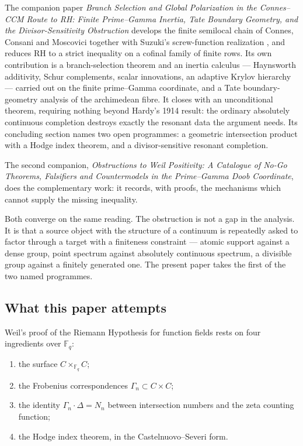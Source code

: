 \documentclass[11pt]{amsart}
\theoremstyle{definition}
\theoremstyle{remark}
\newcommand{\RH}{\mathrm{RH}}
\begin{document}
The companion paper \emph{Branch Selection and Global Polarization in the
Connes--CCM Route to RH: Finite Prime--Gamma Inertia, Tate Boundary
Geometry, and the Divisor-Sensitivity Obstruction} develops the finite
semilocal chain of Connes, Consani and Moscovici \cite{CCM2025} together
with Suzuki's screw-function realization \cite{Suzuki2025,SuzukiScrew}, and
reduces $\RH$ to a strict inequality on a cofinal family of finite rows.  Its
own contribution is a branch-selection theorem and an inertia calculus ---
Haynsworth additivity, Schur complements, scalar innovations, an adaptive
Krylov hierarchy --- carried out on the finite prime--Gamma coordinate, and
a Tate boundary-geometry analysis of the archimedean fibre.  It closes with
an unconditional theorem, requiring nothing beyond Hardy's 1914 result: the
ordinary absolutely continuous completion destroys exactly the resonant data
the argument needs.  Its concluding section names two open programmes: a
geometric intersection product with a Hodge index theorem, and a
divisor-sensitive resonant completion.

The second companion, \emph{Obstructions to Weil Positivity: A Catalogue of
No-Go Theorems, Falsifiers and Countermodels in the Prime--Gamma Doob
Coordinate}, does the complementary work: it records, with proofs, the
mechanisms which cannot supply the missing inequality.

Both converge on the same reading.  The obstruction is not a gap in the
analysis.  It is that a source object with the structure of a continuum is
repeatedly asked to factor through a target with a finiteness constraint ---
atomic support against a dense group, point spectrum against absolutely
continuous spectrum, a divisible group against a finitely generated one.
The present paper takes the first of the two named programmes.

\subsection{What this paper attempts}

Weil's proof of the Riemann Hypothesis for function fields
\cite{Weil1948,Weil1952} rests on four ingredients over $\mathbb F_q$:

\begin{enumerate}
\item[(a)] the surface $C\times_{\mathbb F_q}C$;
\item[(b)] the Frobenius correspondences $\Gamma_n\subset C\times C$;
\item[(c)] the identity $\Gamma_n\cdot\Delta=N_n$ between intersection
numbers and the zeta counting function;
\item[(d)] the Hodge index theorem, in the Castelnuovo--Severi form.
\end{enumerate}
\end{document}
